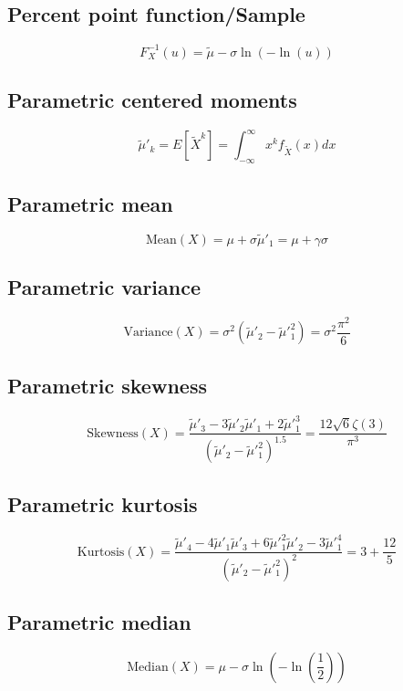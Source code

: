 \documentclass{article}
\begin{document}
\subsection{Percent point function/Sample}
\begin{equation*} F^{-1}_{X}\left(u\right)=\tilde{\mu}-\sigma\ln\left(-\ln\left(u\right)\right) \end{equation*}
\subsection{Parametric centered moments}
\begin{equation*} \tilde{\mu}'_{k}=E[\tilde{X}^k]=\int_{-\infty}^{\infty}x^{k}f_{\tilde{X}}\left(x\right)dx \end{equation*}
\subsection{Parametric mean}
\begin{equation*} \mathrm{Mean}(X)=\mu+\sigma\tilde{\mu}'_{1}=\mu+\gamma\sigma \end{equation*}
\subsection{Parametric variance}
\begin{equation*} \mathrm{Variance}(X)=\sigma^{2}(\tilde{\mu}'_{2}-\tilde{\mu}'^{2}_{1})=\sigma^{2}\frac{\pi^{2}}{6} \end{equation*}
\subsection{Parametric skewness}
\begin{equation*} \mathrm{Skewness}(X)=\frac{\tilde{\mu}'_{3}-3\tilde{\mu}'_{2}\tilde{\mu}'_{1}+2\tilde{\mu}'^{3}_{1}}{(\tilde{\mu}'_{2}-\tilde{\mu}'^{2}_{1})^{1.5}}=\frac{12\sqrt{6}\zeta(3)}{\pi^{3}} \end{equation*}
\subsection{Parametric kurtosis}
\begin{equation*} \mathrm{Kurtosis}(X)=\frac{\tilde{\mu}'_{4}-4\tilde{\mu}'_{1}\tilde{\mu}'_{3}+6\tilde{\mu}'^{2}_{1}\tilde{\mu}'_{2}-3\tilde{\mu}'^{4}_{1}}{(\tilde{\mu}'_{2}-\tilde{\mu}'^{2}_{1})^{2}}=3+\frac{12}{5} \end{equation*}
\subsection{Parametric median}
\begin{equation*} \mathrm{Median}(X)=\mu-\sigma\ln\left(-\ln\left(\frac{1}{2}\right)\right) \end{equation*}
\end{document}

